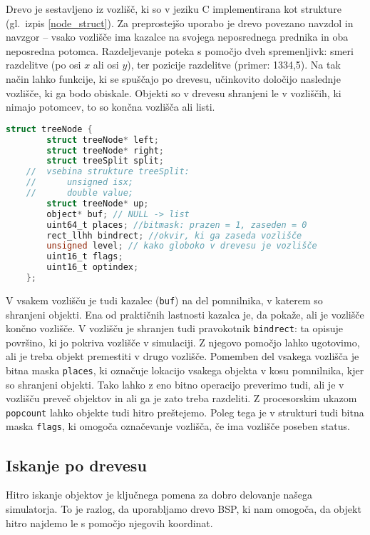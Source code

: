 \documentclass[a4paper,12pt]{article}
\begin{document}
Drevo je sestavljeno iz vozlišč, ki so v jeziku C implementirana kot strukture (gl.\ izpis \ref{node_struct}).
Za preprostejšo uporabo je drevo povezano navz\-dol in navzgor -- vsako vozlišče ima kazalce na svojega
neposrednega prednika in oba neposredna potomca.
Razdeljevanje poteka s pomočjo dveh spremenljivk: smeri razdelitve (po osi $x$ ali osi $y$), ter
pozicije razdelitve (primer: 1334,5). Na tak način lahko funkcije, ki se spuščajo po drevesu,
učinkovito določijo naslednje vozlišče, ki ga bodo obiskale. Objekti so v
drevesu shranjeni le v vozliščih, ki nimajo potomcev, to so končna vozlišča ali listi.

\begin{lstlisting}[float, caption={Struktura vozlišča}, label=node_struct, language=C]
    struct treeNode {
        struct treeNode* left;
        struct treeNode* right;
        struct treeSplit split;
    //  vsebina strukture treeSplit:
    //      unsigned isx;
    //      double value;
        struct treeNode* up;
        object* buf; // NULL -> list
        uint64_t places; //bitmask: prazen = 1, zaseden = 0
        rect_llhh bindrect; //okvir, ki ga zaseda vozlišče
        unsigned level; // kako globoko v drevesu je vozlišče
        uint16_t flags;
        uint16_t optindex;
    };
\end{lstlisting}

V vsakem vozlišču je tudi kazalec (\lstinline|buf|) na
del pomnilnika, v katerem so shranjeni objekti. Ena od praktičnih lastnosti kazalca je, da pokaže, ali je vozlišče končno vozlišče.
V vozlišču je shranjen tudi pravokotnik \lstinline|bindrect|: ta opisuje površino, ki jo pokriva vozlišče v simulaciji.
Z njegovo pomočjo lahko ugotovimo, ali je treba objekt premestiti v drugo vozlišče.
Pomemben del vsakega vozlišča je bitna maska \lstinline|places|, ki označuje lokacijo vsakega objekta v kosu
pomnilnika, kjer so shranjeni objekti. Tako lahko z eno bitno operacijo preverimo tudi, ali je v vozlišču
preveč objektov in ali ga je zato treba razdeliti. Z procesorskim ukazom \lstinline|popcount| lahko objekte tudi
hitro preštejemo. Poleg tega je v strukturi tudi bitna maska \lstinline|flags|, ki omogoča označevanje vozlišča,
če ima vozlišče poseben status.

\subsection{Iskanje po drevesu}

Hitro iskanje objektov je ključnega pomena za dobro delovanje našega simulatorja.
To je razlog, da uporabljamo drevo BSP, ki nam omogoča, da objekt hitro najdemo le s
pomočjo njegovih koordinat.
\end{document}
